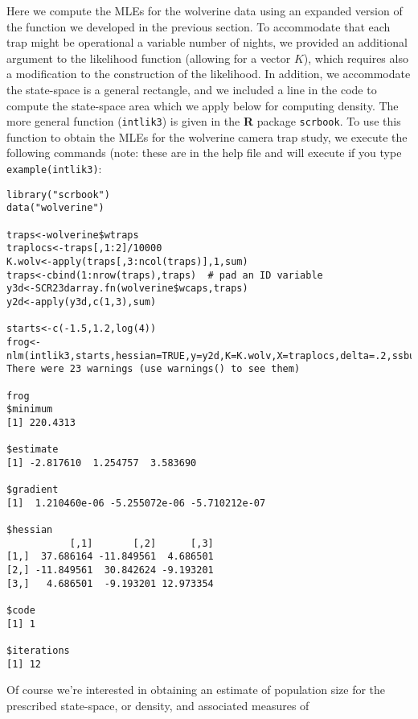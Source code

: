 Here we compute the MLEs for the wolverine data using an expanded
version of the function we developed in the previous section. To
accommodate that each trap might be operational a variable number of
nights, we provided an additional argument to the likelihood function
(allowing for a vector $K$), which requires also a modification to the
construction of the likelihood.  In addition,
we accommodate  the state-space is a general rectangle, and
we included a line in the code to compute the state-space area which
we apply below for computing density.  The more general function
(\mbox{\tt intlik3}) is given in the {\bf R} package \mbox{\tt scrbook}. 
To use this function to obtain the MLEs for the wolverine camera trap
study, we execute the following commands (note: these are in the help
file and will execute if you type \mbox{\tt example(intlik3)}:
{\small
\begin{verbatim}
library("scrbook")
data("wolverine")
 
traps<-wolverine$wtraps
traplocs<-traps[,1:2]/10000
K.wolv<-apply(traps[,3:ncol(traps)],1,sum)
traps<-cbind(1:nrow(traps),traps)  # pad an ID variable
y3d<-SCR23darray.fn(wolverine$wcaps,traps)
y2d<-apply(y3d,c(1,3),sum)

starts<-c(-1.5,1.2,log(4))
frog<-nlm(intlik3,starts,hessian=TRUE,y=y2d,K=K.wolv,X=traplocs,delta=.2,ssbuffer=2)
There were 23 warnings (use warnings() to see them)

frog
$minimum
[1] 220.4313

$estimate
[1] -2.817610  1.254757  3.583690

$gradient
[1]  1.210460e-06 -5.255072e-06 -5.710212e-07

$hessian
           [,1]       [,2]      [,3]
[1,]  37.686164 -11.849561  4.686501
[2,] -11.849561  30.842624 -9.193201
[3,]   4.686501  -9.193201 12.973354

$code
[1] 1

$iterations
[1] 12
\end{verbatim}
}
Of course we're interested in obtaining an estimate of population size
for the prescribed state-space, or density, and associated measures of
